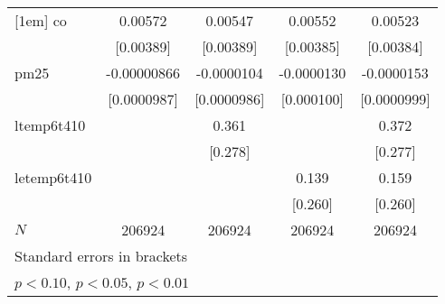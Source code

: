 \documentclass[11pt]{article}
\begin{document}
\begin{center}
{\begin{tabular}{l*{4}{c}}
				[1em]
				co          &     0.00572         &     0.00547         &     0.00552         &     0.00523         \\
				&   [0.00389]         &   [0.00389]         &   [0.00385]         &   [0.00384]         \\
				[1em]
				pm25        & -0.00000866         &  -0.0000104         &  -0.0000130         &  -0.0000153         \\
				& [0.0000987]         & [0.0000986]         &  [0.000100]         & [0.0000999]         \\
				[1em]
				ltemp6t410  &                     &       0.361         &                     &       0.372         \\
				&                     &     [0.278]         &                     &     [0.277]         \\
				[1em]
				letemp6t410 &                     &                     &       0.139         &       0.159         \\
				&                     &                     &     [0.260]         &     [0.260]         \\
				\hline
				\(N\)       &      206924         &      206924         &      206924         &      206924         \\
				\hline\hline
				\multicolumn{5}{l}{\footnotesize Standard errors in brackets}\\
				\multicolumn{5}{l}{\footnotesize \sym{*} \(p<0.10\), \sym{**} \(p<0.05\), \sym{***} \(p<0.01\)}\\
			\end{tabular}
		}
	\end{center}
\end{document}
